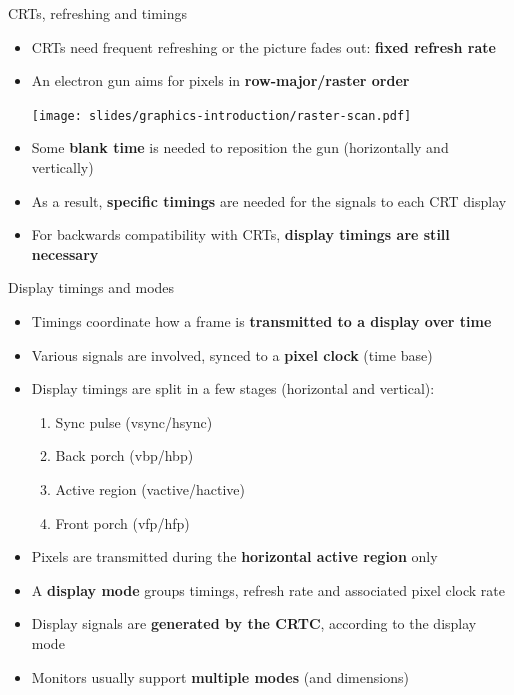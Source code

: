 \begin{frame}{CRTs, refreshing and timings}
  \begin{itemize}
  \item CRTs need frequent refreshing or the picture fades out: \textbf{fixed refresh rate}
  \item An electron gun aims for pixels in \textbf{row-major/raster order}
  \begin{center}
  \texttt{[image: slides/graphics-introduction/raster-scan.pdf]}
  \end{center}
  \item Some \textbf{blank time} is needed to reposition the gun (horizontally and vertically)
  \item As a result, \textbf{specific timings} are needed for the signals to each CRT display
  \item For backwards compatibility with CRTs, \textbf{display timings are still necessary}
  \end{itemize}
\end{frame}

\begin{frame}{Display timings and modes}
  \begin{itemize}
  \item Timings coordinate how a frame is \textbf{transmitted to a display over time}
  \item Various signals are involved, synced to a \textbf{pixel clock} (time base)
  \item Display timings are split in a few stages (horizontal and vertical):
    \begin{enumerate}
    \item Sync pulse (vsync/hsync)
    \item Back porch (vbp/hbp)
    \item Active region (vactive/hactive)
    \item Front porch (vfp/hfp)
    \end{enumerate}
  \item Pixels are transmitted during the \textbf{horizontal active region} only
  \item A \textbf{display mode} groups timings, refresh rate and associated pixel clock rate
  \item Display signals are \textbf{generated by the CRTC}, according to the display mode
  \item Monitors usually support \textbf{multiple modes} (and dimensions)
  \end{itemize}
\end{frame}

